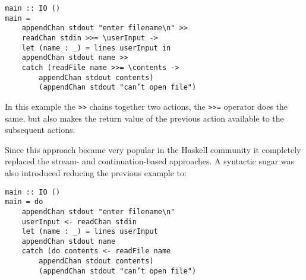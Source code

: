 \begin{lstlisting}[caption={Example of monadic I/O in Haskell}]
main :: IO ()
main =
	appendChan stdout "enter filename\n" >>
	readChan stdin >>= \userInput ->
	let (name : _) = lines userInput in
	appendChan stdout name >>
	catch (readFile name >>= \contents ->
		appendChan stdout contents)
		(appendChan stdout "can’t open file")
\end{lstlisting}

In this example the \lstinline!>>! chains together two actions, the \lstinline!>>=! operator does the same, but also makes the return value of the previous action available to the subsequent actions.

Since this approach became very popular in the Haskell community it completely replaced the stream- and continuation-based approaches. A syntactic sugar was also introduced reducing the previous example to:

\begin{lstlisting}[caption={Example of monadic I/O in Haskell}]
main :: IO ()
main = do
	appendChan stdout "enter filename\n"
	userInput <- readChan stdin
	let (name : _) = lines userInput
	appendChan stdout name
	catch (do contents <- readFile name
		appendChan stdout contents)
		(appendChan stdout "can’t open file")
\end{lstlisting}
